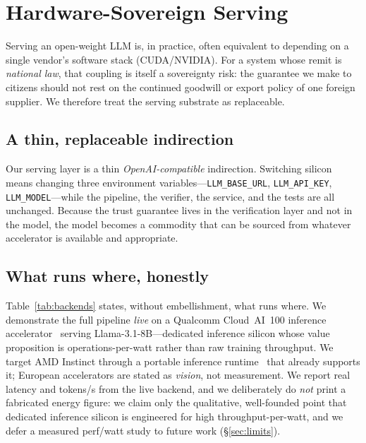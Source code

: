 \section{Hardware-Sovereign Serving}
\label{sec:sovereign}

Serving an open-weight LLM is, in practice, often equivalent to depending on a
single vendor's software stack (CUDA/NVIDIA). For a system whose remit is
\emph{national law}, that coupling is itself a sovereignty risk: the guarantee
we make to citizens should not rest on the continued goodwill or export policy
of one foreign supplier. We therefore treat the serving substrate as
replaceable.

\subsection{A thin, replaceable indirection}
Our serving layer is a thin \emph{OpenAI-compatible} indirection. Switching
silicon means changing three environment variables---\texttt{LLM\_BASE\_URL},
\texttt{LLM\_API\_KEY}, \texttt{LLM\_MODEL}---while the pipeline, the verifier,
the service, and the tests are all unchanged. Because the trust guarantee lives
in the verification layer and not in the model, the model becomes a commodity
that can be sourced from whatever accelerator is available and appropriate.

\subsection{What runs where, honestly}
Table~\ref{tab:backends} states, without embellishment, what runs where. We
demonstrate the full pipeline \emph{live} on a Qualcomm Cloud~AI~100 inference
accelerator~\cite{qualcommcloudai100} serving Llama-3.1-8B---dedicated
inference silicon whose value proposition is operations-per-watt rather than
raw training throughput. We target AMD Instinct through a portable inference
runtime~\cite{modularmax2024} that already supports it; European accelerators
are stated as \emph{vision}, not measurement. We report real latency and
tokens/s from the live backend, and we deliberately do \emph{not} print a
fabricated energy figure: we claim only the qualitative, well-founded point
that dedicated inference silicon is engineered for high throughput-per-watt,
and we defer a measured perf/watt study to future work (\S\ref{sec:limits}).

